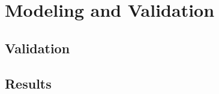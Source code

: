 
\section{Modeling and Validation}%
\label{sec:modeling-and-validation}

\subsection{Validation}%
\label{sub:validation}

\subsection{Results}%
\label{sub:results}
